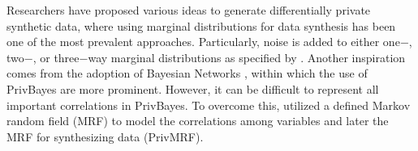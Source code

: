 Researchers have proposed various ideas to generate differentially private synthetic data, where using marginal distributions for data synthesis has been one of the most prevalent approaches. Particularly, noise is added to either one$-$, two$-$, or three$-$way marginal distributions
as specified by \citet{mckenna2019graphical}. Another inspiration comes from the adoption of Bayesian Networks \citep{bao2021synthetic}, within which the use of PrivBayes \citet{zhang2017privbayes} are more prominent. However, it can be difficult to 
represent all important correlations in PrivBayes. To overcome this, \citet{cai2021data} utilized a defined Markov random field (MRF) to model the correlations among variables and later the MRF for synthesizing data (PrivMRF).


